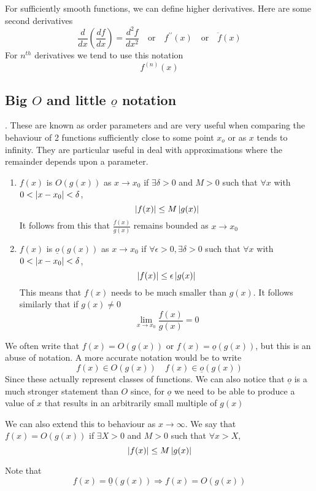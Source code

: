 \documentclass{article}
\begin{document}
For sufficiently smooth functions, we can define higher derivatives. Here are some second derivatives
\[
    \frac{d}{dx}\left(\frac{df}{dx}\right) = \frac{d^2f}{dx^2} \quad \text{or} \quad f^{\prime\prime}(x) \quad \text{or} \quad \ddot{f}(x)
\]
For $n^{th}$ derivatives we tend to use this notation
\[
    f^{(n)}(x)
\]

\subsection{Big $O$ and little $\underline{o}$ notation}.
These are known as order parameters and are very useful when comparing the behaviour of 2 functions sufficiently close to some point $x_o$ or as $x$ tends to infinity. They are particular useful in deal with approximations where the remainder depends upon a parameter.

\begin{defi}\leavevmode
    \begin{enumerate}
        \item $f(x)$ is $O(g(x))$ as $x \rightarrow x_0$ if $\exists \delta > 0$ and $M > 0$ such that $\forall x$ with $0 < \left\lvert x - x_0\right\rvert < \delta$,
        \[
            \left\lvert f(x)\right\rvert \leq M\left\lvert g(x)\right\rvert  
        \]
        It follows from this that $\frac{f(x)}{g(x)}$ remains bounded as $x \rightarrow x_0$
        \item $f(x)$ is $\underline{o}(g(x))$ as $x \rightarrow x_0$ if $\forall \epsilon > 0, \exists \delta > 0$ such that $\forall x$ with $0 < \left\lvert x - x_0\right\rvert < \delta$,
        \[
            \left\lvert f(x)\right\rvert \leq \epsilon\left\lvert g(x)\right\rvert  
        \]
        This means that $f(x)$ needs to be much smaller than $g(x)$. It follows similarly that if $g(x) \neq 0 $
        \[
            \lim_{x \rightarrow x_0}{\frac{f(x)}{g(x)}} = 0  
        \]
    \end{enumerate}
    We often write that $f(x) = O(g(x))$ or $f(x) = \underline{o}(g(x))$, but this is an abuse of notation. A more accurate notation would be to write
    \[
        f(x) \in O(g(x)) \quad f(x) \in \underline{o}(g(x))
    \]
    Since these actually represent classes of functions. We can also notice that $\underline{o}$ is a much stronger statement than $O$ since, for $\underline{o}$ we need to be able to produce a value of $x$ that results in an arbitrarily small multiple of $g(x)$

    We can also extend this to behaviour as $x \rightarrow \infty$. We say that $f(x) = O(g(x))$ if $\exists X > 0$ and $M > 0$ such that $\forall x > X$,
    \[
        \left\lvert f(x)\right\rvert \leq M\left\lvert g(x)\right\rvert  
    \]

    Note that
    \[
        f(x) = \underline{0}(g(x)) \Rightarrow f(x) = O(g(x))  
    \]
\end{defi}
\end{document}
